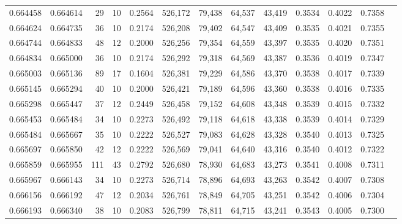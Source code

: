\begin{tabular}{rrrrrrrrrrrrr}
0.664458 & 0.664614 &    29 &  10 &                                     0.2564 & 526,172 &  79,438 &  64,537 &  43,419 & 0.3534 & 0.4022 & 0.7358 \\
0.664624 & 0.664735 &    36 &  10 &                                     0.2174 & 526,208 &  79,402 &  64,547 &  43,409 & 0.3535 & 0.4021 & 0.7355 \\
0.664744 & 0.664833 &    48 &  12 &                                     0.2000 & 526,256 &  79,354 &  64,559 &  43,397 & 0.3535 & 0.4020 & 0.7351 \\
0.664834 & 0.665000 &    36 &  10 &                                     0.2174 & 526,292 &  79,318 &  64,569 &  43,387 & 0.3536 & 0.4019 & 0.7347 \\
0.665003 & 0.665136 &    89 &  17 &                                     0.1604 & 526,381 &  79,229 &  64,586 &  43,370 & 0.3538 & 0.4017 & 0.7339 \\
0.665145 & 0.665294 &    40 &  10 &                                     0.2000 & 526,421 &  79,189 &  64,596 &  43,360 & 0.3538 & 0.4016 & 0.7335 \\
0.665298 & 0.665447 &    37 &  12 &                                     0.2449 & 526,458 &  79,152 &  64,608 &  43,348 & 0.3539 & 0.4015 & 0.7332 \\
0.665453 & 0.665484 &    34 &  10 &                                     0.2273 & 526,492 &  79,118 &  64,618 &  43,338 & 0.3539 & 0.4014 & 0.7329 \\
0.665484 & 0.665667 &    35 &  10 &                                     0.2222 & 526,527 &  79,083 &  64,628 &  43,328 & 0.3540 & 0.4013 & 0.7325 \\
0.665697 & 0.665850 &    42 &  12 &                                     0.2222 & 526,569 &  79,041 &  64,640 &  43,316 & 0.3540 & 0.4012 & 0.7322 \\
0.665859 & 0.665955 &   111 &  43 &                                     0.2792 & 526,680 &  78,930 &  64,683 &  43,273 & 0.3541 & 0.4008 & 0.7311 \\
0.665967 & 0.666143 &    34 &  10 &                                     0.2273 & 526,714 &  78,896 &  64,693 &  43,263 & 0.3542 & 0.4007 & 0.7308 \\
0.666156 & 0.666192 &    47 &  12 &                                     0.2034 & 526,761 &  78,849 &  64,705 &  43,251 & 0.3542 & 0.4006 & 0.7304 \\
0.666193 & 0.666340 &    38 &  10 &                                     0.2083 & 526,799 &  78,811 &  64,715 &  43,241 & 0.3543 & 0.4005 & 0.7300 \\

\end{tabular}
